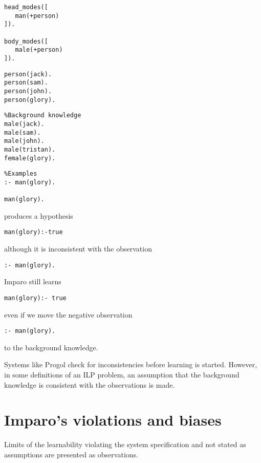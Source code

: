 \begin{minipage}[t]{.25\textwidth}
\begin{lstlisting}
head_modes([
   man(+person)
]).

body_modes([
   male(+person)
]).\end{lstlisting}
\end{minipage}
\begin{minipage}[t]{.20\textwidth}
\begin{lstlisting}
person(jack).
person(sam).
person(john).
person(glory).
\end{lstlisting}
\end{minipage}
\begin{minipage}[t]{.30\textwidth}
\begin{lstlisting}
%Background knowledge
male(jack).
male(sam).
male(john).
male(tristan).
female(glory).
\end{lstlisting}
\end{minipage}
\begin{minipage}[t]{.25\textwidth}
\begin{lstlisting}
%Examples
:- man(glory).

man(glory).
\end{lstlisting}
\end{minipage}

produces a hypothesis
\begin{lstlisting}
man(glory):-true
\end{lstlisting}
although it is inconsistent with the observation
\begin{lstlisting}
:- man(glory).
\end{lstlisting}

Imparo still learns
\begin{lstlisting}
man(glory):- true
\end{lstlisting}
even if we move the negative observation
\begin{lstlisting}
:- man(glory).
\end{lstlisting}
to the background knowledge.

Systems like Progol check for inconsistencies before learning is started. However, in some definitions of an ILP problem, an assumption that the background knowledge is consistent with the observations is made.

\section{Imparo's violations and biases}
Limits of the learnability violating the system specification and not stated as assumptions are presented as observations.

